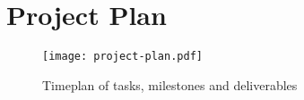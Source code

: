 \section{Project Plan}

\begin{figure}[h]
    \texttt{[image: project-plan.pdf]}
    \caption{Timeplan of tasks, milestones and deliverables}
\end{figure}
